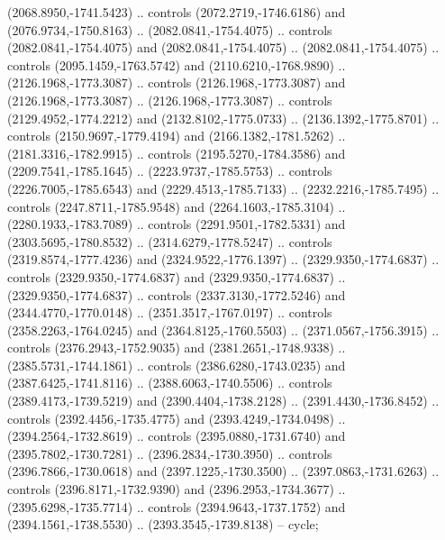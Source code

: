 \begin{scope}[shift={(-24.70323,-217.37029)}]
\begin{scope}[shift={(-1886.1309,2235.3934)}]
\begin{scope}[cm={{0.35985,0.0,0.0,0.35985,(1425.5269,-1101.8372)}}]
        (2068.8950,-1741.5423) .. controls (2072.2719,-1746.6186) and
        (2076.9734,-1750.8163) .. (2082.0841,-1754.4075) .. controls
        (2082.0841,-1754.4075) and (2082.0841,-1754.4075) .. (2082.0841,-1754.4075) ..
        controls (2095.1459,-1763.5742) and (2110.6210,-1768.9890) ..
        (2126.1968,-1773.3087) .. controls (2126.1968,-1773.3087) and
        (2126.1968,-1773.3087) .. (2126.1968,-1773.3087) .. controls
        (2129.4952,-1774.2212) and (2132.8102,-1775.0733) .. (2136.1392,-1775.8701) ..
        controls (2150.9697,-1779.4194) and (2166.1382,-1781.5262) ..
        (2181.3316,-1782.9915) .. controls (2195.5270,-1784.3586) and
        (2209.7541,-1785.1645) .. (2223.9737,-1785.5753) .. controls
        (2226.7005,-1785.6543) and (2229.4513,-1785.7133) .. (2232.2216,-1785.7495) ..
        controls (2247.8711,-1785.9548) and (2264.1603,-1785.3104) ..
        (2280.1933,-1783.7089) .. controls (2291.9501,-1782.5331) and
        (2303.5695,-1780.8532) .. (2314.6279,-1778.5247) .. controls
        (2319.8574,-1777.4236) and (2324.9522,-1776.1397) .. (2329.9350,-1774.6837) ..
        controls (2329.9350,-1774.6837) and (2329.9350,-1774.6837) ..
        (2329.9350,-1774.6837) .. controls (2337.3130,-1772.5246) and
        (2344.4770,-1770.0148) .. (2351.3517,-1767.0197) .. controls
        (2358.2263,-1764.0245) and (2364.8125,-1760.5503) .. (2371.0567,-1756.3915) ..
        controls (2376.2943,-1752.9035) and (2381.2651,-1748.9338) ..
        (2385.5731,-1744.1861) .. controls (2386.6280,-1743.0235) and
        (2387.6425,-1741.8116) .. (2388.6063,-1740.5506) .. controls
        (2389.4173,-1739.5219) and (2390.4404,-1738.2128) .. (2391.4430,-1736.8452) ..
        controls (2392.4456,-1735.4775) and (2393.4249,-1734.0498) ..
        (2394.2564,-1732.8619) .. controls (2395.0880,-1731.6740) and
        (2395.7802,-1730.7281) .. (2396.2834,-1730.3950) .. controls
        (2396.7866,-1730.0618) and (2397.1225,-1730.3500) .. (2397.0863,-1731.6263) ..
        controls (2396.8171,-1732.9390) and (2396.2953,-1734.3677) ..
        (2395.6298,-1735.7714) .. controls (2394.9643,-1737.1752) and
        (2394.1561,-1738.5530) .. (2393.3545,-1739.8138) -- cycle;


\end{scope}
\end{scope}
\end{scope}
